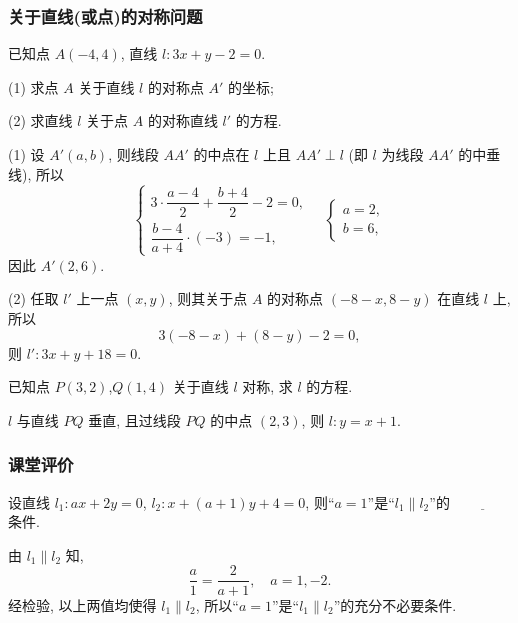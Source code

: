 \subsubsection{关于直线(或点)的对称问题}
\begin{example}
    已知点 $A(-4, 4)$, 直线 $l\colon 3x+y-2=0$.
    
    (1) 求点 $A$ 关于直线 $l$ 的对称点 $A'$ 的坐标;
    
    (2) 求直线 $l$ 关于点 $A$ 的对称直线 $l'$ 的方程.
\end{example}
\beginsolution
    (1) 设 $A'(a,b)$, 则线段 $AA'$ 的中点在 $l$ 上且 $AA'\perp l$ (即 $l$ 为线段 $AA'$ 的中垂线), 所以
    \[\left\{\!\!\begin{array}{l}
        3\cdot \dfrac{a-4}2+ \dfrac{b+4}2- 2= 0,\\
        \dfrac{b-4}{a+4}\cdot (-3)= -1,
    \end{array}\right.\quad
    \left\{\!\!\begin{array}{l}
        a= 2,\\
        b= 6,
    \end{array}\right.\]
    因此 $A'(2,6)$.

    (2) 任取 $l'$ 上一点 $(x,y)$, 
    则其关于点 $A$ 的对称点 $(-8-x,8-y)$ 在直线 $l$ 上, 所以
    \[3(-8-x)+ (8-y)- 2=0,\]
    则 $l'\colon 3x+y+18= 0$.
\endsolution

\lianxi
\begin{exercise}[s]
    已知点 $P(3,2)$,$Q(1,4)$ 关于直线 $l$ 对称, 求 $l$ 的方程.
\end{exercise}
\beginsolution
    $l$ 与直线 $PQ$ 垂直, 且过线段 $PQ$ 的中点 $(2,3)$, 则 $l\colon y=x+1$.
\endsolution

\subsubsection{课堂评价}

\begin{exercise}
    设直线 $l_1 \colon ax+2y=0$, $l_2 \colon x+(a+1)y+4=0$, 则“$a=1$”是“$l_1\parallel l_2$”的 $\underline{\qquad\qquad}$ 条件.
\end{exercise}
\beginsolution
    由 $l_1\parallel l_2$ 知,
    \[\frac{a}1= \frac2{a+1},\quad a=1,-2.\]
    经检验, 以上两值均使得 $l_1\parallel l_2$, 所以“$a=1$”是“$l_1\parallel l_2$”的充分不必要条件.
\endsolution

